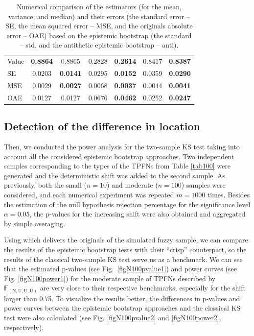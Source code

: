 \begin{table}[htbp]
\begin{tabular}{l|cc|cc|cc}
Value & \textbf{0.8864} & 0.8865 & 0.2828 & \textbf{0.2614} & 0.8417 & \textbf{0.8387} \\
  SE & 0.0203 & \textbf{0.0141} & 0.0295 & \textbf{0.0152} & 0.0359 & \textbf{0.0290} \\
  MSE & 0.0029 & \textbf{0.0027} & 0.0068 & \textbf{0.0037} & 0.0044 & \textbf{0.0041} \\
  OAE & 0.0127 & 0.0127 & 0.0676 & \textbf{0.0462} & 0.0252 & \textbf{0.0247} \\

   \hline
\end{tabular}
\caption{Numerical comparison of the estimators (for the mean, variance, and median) and their errors (the standard error -- SE, the mean squared error -- MSE, and the originals absolute error -- OAE) based on the epistemic bootstrap (the standard -- std,  and the antithetic epistemic bootstrap -- anti).}\label{tab200}
\end{table}




\subsection{Detection of the difference in location}


Then, we conducted the power analysis for the two-sample KS test taking into account all the considered epistemic bootstrap approaches.
Two independent samples corresponding to the types of the TPFNs from Table \ref{tab100} were generated and the deterministic shift was added to the second sample.
As previously, both the small ($n=10$) and moderate ($n=100$) samples were considered, and each numerical experiment was repeated $m=1000$ times.
Besides the estimation of the null hypothesis rejection percentage for the significance level $\alpha =0.05$, the p-values for the increasing shift were also obtained and aggregated by simple averaging.

Using  which delivers the originals of the simulated fuzzy sample, we can compare the results of the epistemic bootstrap tests with their ``crisp'' counterpart, so the results of the classical two-sample KS test serve us as a benchmark.
We can see that the estimated p-values (see Fig.~\ref{figN100pvalue1}) and power curves (see Fig. \ref{figN100power1}) for the moderate sample of TPFNs described by $\mathbb{F}_{(\mathrm{N,U,U,U})}$ are very close to their respective benchmarks, especially for the shift larger than 0.75.
To visualize the results better, the differences in p-values and power curves between the epistemic bootstrap approaches and the classical KS test were also calculated (see Fig. \ref{figN100pvalue2} and \ref{figN100power2}, respectively).


